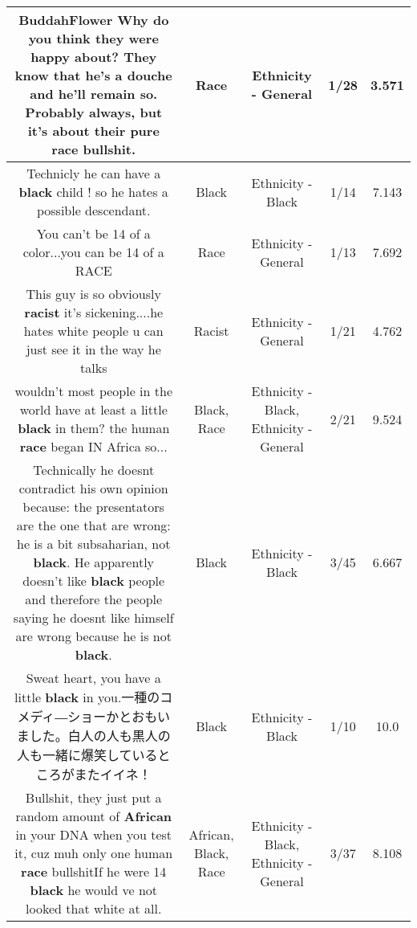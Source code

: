 \documentclass[11pt]{article}
\newlength\mylength
\begin{document}
\begin{center}
\begin{longtable}{|C{.65\mylength}|C{.30\mylength}|C{.12\mylength}|C{.12\mylength}|C{.12\mylength}|}
  \small BuddahFlower Why do you think they were happy about? They know that he's a douche and he'll remain so. Probably always, but it's about their pure \textbf{race} bullshit.\normalsize   & Race & Ethnicity - General & 1/28 & 3.571 \\  \hline
  \small Technicly he can have a \textbf{black} child ! so he hates a possible descendant.\normalsize   & Black & Ethnicity - Black & 1/14 & 7.143 \\  \hline
  \small You can't be 14 of a color...you can be 14 of a RACE\normalsize   & Race & Ethnicity - General & 1/13 & 7.692 \\  \hline
  \small This guy is so obviously \textbf{racist} it's sickening....he hates white people u can just see it in the way he talks\normalsize   & Racist & Ethnicity - General & 1/21 & 4.762 \\  \hline
  \small wouldn't most people in the world have at least a little \textbf{black} in them? the human \textbf{race} began IN Africa so...\normalsize   & Black, Race & Ethnicity - Black, Ethnicity - General & 2/21 & 9.524 \\  \hline
  \small Technically he doesnt contradict his own opinion because: the presentators are the one that are wrong: he is a bit subsaharian, not \textbf{black}. He apparently doesn't like \textbf{black} people and therefore the people saying he doesnt like himself are wrong because he is not \textbf{black}.\normalsize   & Black & Ethnicity - Black & 3/45 & 6.667 \\  \hline
  \small Sweat heart, you have a little \textbf{black} in you.一種のコメディ―ショーかとおもいました。白人の人も黒人の人も一緒に爆笑しているところがまたイイネ！\normalsize   & Black & Ethnicity - Black & 1/10 & 10.0 \\  \hline
  \small Bullshit, they just put a random amount of \textbf{African} in your DNA when you test it, cuz muh only one human \textbf{race} bullshitIf he were 14 \textbf{black} he would ve not looked that white at all.\normalsize   & African, Black, Race & Ethnicity - Black, Ethnicity - General & 3/37 & 8.108 \\  \hline

\end{longtable}
\end{center}
\end{document}
